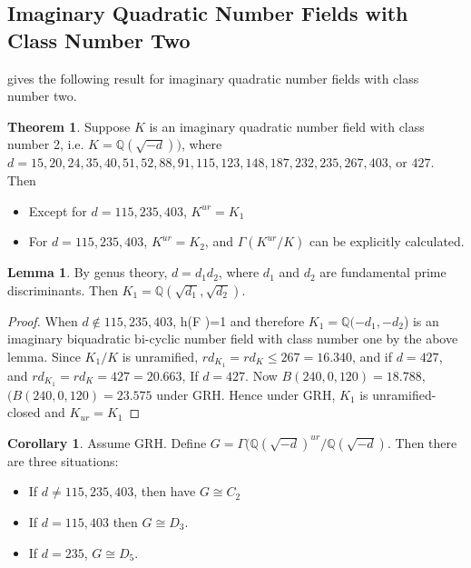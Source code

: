 \documentclass[12pt]{extarticle}
\newcommand{\Q}{\mathbb{Q}}
\newcommand{\<}{\langle}
\renewcommand{\>}{\rangle}
\theoremstyle{definition}
\newtheorem{theorem}{Theorem}
\newtheorem{corollary}{Corollary}
\newtheorem{lemma}{Lemma}
\begin{document}
\subsection{Imaginary Quadratic Number Fields with Class Number Two}
\cite{YAMAMURA1996} gives the following result for imaginary quadratic number fields with class number two.
\begin{theorem}
Suppose $K$ is an imaginary quadratic number field with class number 2, i.e. $K=\Q(\sqrt{-d}))$, where $d= 15, 20, 24, 35, 40, 51, 52, 88, 91, 115, 123, 148, 187, 232, 235, 267, 403$, or $427$. Then \begin{itemize}
\item Except for $d = 115, 235, 403$, $K^{ur} = K_1$
\item For $d = 115, 235, 403$,  $K^{ur} = K_2$, and $\Gamma(K^{ur}/K)$ can be explicitly calculated. 
\end{itemize}
\end{theorem}
\begin{lemma}
By genus theory, $d= d_1d_2$, where $d_1$ and $d_2$ are fundamental prime discriminants. Then $K_1 = \Q(\sqrt{d_1},\sqrt{d_2})$. 
\end{lemma}
\begin{proof}
When $d \not \in {115, 235, 403}$, h(F )=1 and therefore 
$K_1 =\Q(- d_1, - d_2 $) is an imaginary biquadratic bi-cyclic number field with class number one by the above lemma. Since $K_1/K$ is unramified,  $rd_{K_1}=rd_K \leq 267=16.340$, and  if $d = 427$, and $rd_{K_1}=rd_K = 427=20.663$, If $d=427$. Now  $B(240, 0, 120) = 18.788$, $(B(240, 0, 120) = 23.575$ under GRH. Hence under GRH, $K_1$ is unramified-closed and $K_{ur}=K_1$ 
\end{proof}
\begin{corollary}
Assume GRH. Define $G = \Gamma(\Q(\sqrt{-d})^{ur}/\Q(\sqrt{-d})$. Then there are three situations:
\begin{itemize}
\item If $d \neq 115, 235, 403$, then have $ G \cong C_2$
\item If $d = 115,403$ then $G \cong D_3$.
\item If $d =  235$, $G \cong D_5$. 
\end{itemize}
\end{corollary}
\end{document}
